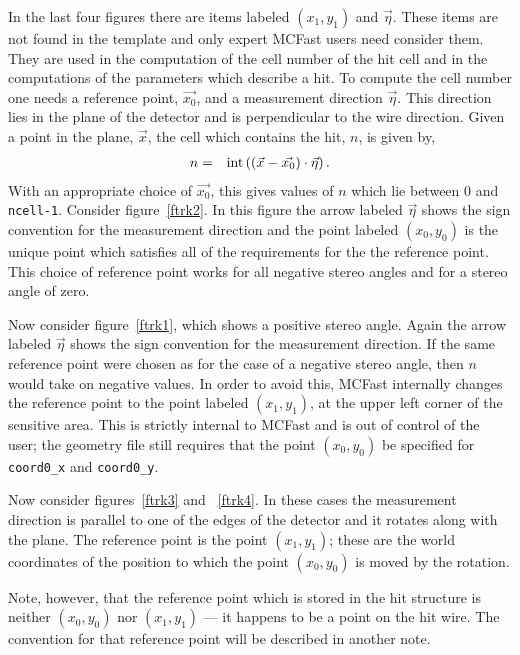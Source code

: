 In the last four figures there are items labeled
$(x_1,y_1)$ and $\vec{\eta}$.  These items are not found in the
template and only expert MCFast users need consider them.
They are used in the computation of the cell number of the hit cell
and in the computations of the parameters which describe
a hit.  To compute the cell number one needs a 
reference point, $\vec{x_0}$, and a measurement direction $\vec{\eta}$.
This direction lies in the plane of the detector and is perpendicular 
to the wire direction.  Given a point in the plane, $\vec{x}$, the
cell which contains the hit, $n$, is given by,
\begin{eqnarray}
n &=& {\rm int}\left( (\vec{x}-\vec{x_0})\cdot\vec{\eta}\right).
\end{eqnarray}
With an appropriate choice of $\vec{x_0}$, this gives values
of $n$ which lie between 0 and {\tt ncell-1}.  
Consider figure~\ref{ftrk2}.
In this figure the arrow labeled
$\vec{\eta}$ shows the sign convention for the
measurement direction and the point  
labeled $(x_0,y_0)$ is the unique point which satisfies all
of the requirements for the the reference point.  This
choice of reference point works for all negative stereo angles 
and for a stereo angle of zero.

Now consider figure~\ref{ftrk1}, which shows a positive stereo angle.
Again the arrow labeled $\vec{\eta}$
shows the sign convention for the measurement direction.
If the same reference point were chosen as for the case of a negative stereo
angle, then $n$ would take on negative values.  In order to avoid this,
MCFast internally changes the reference point to the point labeled 
$(x_1,y_1)$, at the upper left corner of the sensitive area.
This is strictly internal to MCFast and is out of control
of the user; the geometry file still
requires that the point $(x_0,y_0)$ be specified for
{\tt coord0\_x} and {\tt coord0\_y}.

Now consider figures~\ref{ftrk3} and ~\ref{ftrk4}.  In these cases
the measurement direction is parallel to one of the edges of the
detector and it rotates along with the plane.  The reference point
is the point $(x_1,y_1)$; these are the world coordinates of the
position to which the point $(x_0,y_0)$ is moved by the rotation.

Note, however, that the reference point which is stored in the
hit structure is neither $(x_0,y_0)$ nor $(x_1,y_1)$ --- it happens
to be a point on the hit wire.  The convention for that reference 
point will be described in another note.


